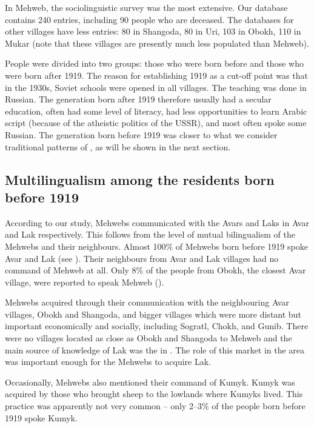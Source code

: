 \documentclass[output=paper]{langsci/langscibook}
\begin{document}
In Mehweb, the sociolinguistic survey was the most extensive. Our
database contains 240 entries, including 90 people who are deceased. The
databases for other villages have less entries: 80 in Shangoda, 80 in
Uri, 103 in Obokh, 110 in Mukar (note that these villages are presently
much less populated than Mehweb).

People were divided into two groups: those who were born before and those
who were born after 1919. The reason for establishing 1919 as a cut-off
point was that in the 1930s, Soviet schools were opened in all villages.
The teaching was done in Russian. The generation born after 1919
therefore usually had a secular education, often had some level of
literacy, had less opportunities to learn Arabic script (because of the
atheistic politics of the USSR), and most often spoke some Russian. The
generation born before 1919 was closer to what we consider traditional
patterns of , as will be shown in the next section.

\subsection{Multilingualism among the residents born before 1919}\label{multilingualism-among-the-residents-born-before-1919}

According to our study, Mehwebs communicated with the Avars and Laks in Avar
and Lak respectively. This follows from the level of mutual bilingualism
of the Mehwebs and their neighbours. Almost 100\% of Mehwebs born before
1919 spoke Avar and Lak (see ). Their neighbours from Avar and
Lak villages had no command of Mehweb at all. Only 8\% of the people
from Obokh, the closest Avar village, were reported to speak Mehweb
().

Mehwebs acquired  through their communication with the neighbouring
Avar villages, Obokh and Shangoda, and bigger villages which were more
distant but important economically and socially, including Sogratl,
Chokh, and Gunib. There were no  villages located as close as Obokh
and Shangoda to Mehweb and the main source of knowledge of Lak was the
 in . The role of this market in the area was important
enough for the Mehwebs to acquire Lak.

Occasionally, Mehwebs also mentioned their command of Kumyk. Kumyk was
acquired by those who brought sheep to the lowlands where Kumyks lived.
This practice was apparently not very common – only 2–3\% of the people
born before 1919 spoke Kumyk.
\end{document}
